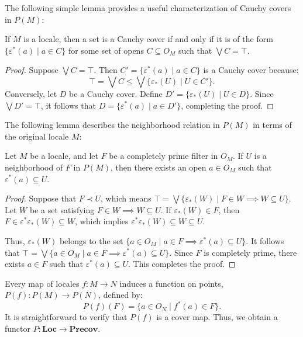 \documentclass[reqno]{amsart}
\theoremstyle{definition}
\theoremstyle{remark}
\numberwithin{figure}{section}
\newcommand{\rb}{\prec}
\newcommand{\cat}[1]{\mathbf{#1}}
\begin{document}
The following simple lemma provides a useful characterization of Cauchy covers in $P(M)$:

\begin{lem}
If $M$ is a locale, then a set is a Cauchy cover if and only if it is of the form $\{ \varepsilon^*(a) \mid a \in C \}$ for some set of opens $C \subseteq O_M$ such that $\bigvee C = \top$.
\end{lem}
\begin{proof}
Suppose $\bigvee C = \top$.
Then $C' = \{ \varepsilon^*(a) \mid a \in C \}$ is a Cauchy cover because:
\[ \top = \bigvee C \leq \bigvee \{ \varepsilon_*(U) \mid U \in C' \}. \]
Conversely, let $D$ be a Cauchy cover.
Define $D' = \{ \varepsilon_*(U) \mid U \in D \}$.
Since $\bigvee D' = \top$, it follows that $D = \{ \varepsilon^*(a) \mid a \in D' \}$, completing the proof.
\end{proof}

The following lemma describes the neighborhood relation in $P(M)$ in terms of the original locale $M$:

\begin{lem}
Let $M$ be a locale, and let $F$ be a completely prime filter in $O_M$.
If $U$ is a neighborhood of $F$ in $P(M)$, then there exists an open $a \in O_M$ such that $\varepsilon^*(a) \subseteq U$.
\end{lem}
\begin{proof}
Suppose that ${ F } \rb U$, which means $\top = \bigvee \{ \varepsilon_*(W) \mid F \in W \implies W \subseteq U \}$.
Let $W$ be a set satisfying $F \in W \implies W \subseteq U$.
If $\varepsilon_*(W) \in F$, then $F \in \varepsilon^*\varepsilon_*(W) \subseteq W$, which implies $\varepsilon^*\varepsilon_*(W) \subseteq W \subseteq U$.

Thus, $\varepsilon_*(W)$ belongs to the set $\{ a \in O_M \mid a \in F \implies \varepsilon^*(a) \subseteq U \}$.
It follows that $\top = \bigvee \{ a \in O_M \mid a \in F \implies \varepsilon^*(a) \subseteq U \}$.
Since $F$ is completely prime, there exists $a \in F$ such that $\varepsilon^*(a) \subseteq U$.
This completes the proof.
\end{proof}

Every map of locales $f : M \to N$ induces a function on points, $P(f) : P(M) \to P(N)$, defined by:
\[ P(f)(F) = \{ a \in O_N \mid f^*(a) \in F \}. \]
It is straightforward to verify that $P(f)$ is a cover map.
Thus, we obtain a functor $P : \cat{Loc} \to \cat{Precov}$.
\end{document}
